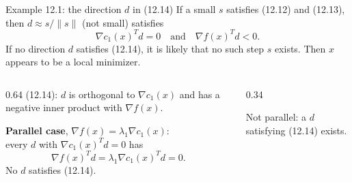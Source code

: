 \documentclass[aspectratio=169,12pt]{beamer}
\newcommand{\gradf}{\nabla f}
\begin{document}
\begin{frame}{Example 12.1: the direction $d$ in (12.14)}
  If a small $s$ satisfies (12.12) and (12.13), then $d\approx s/\|s\|$ (not small) satisfies
  \[ \nabla c_{1}(x)^{T}d=0\quad\text{and}\quad\gradf(x)^{T}d<0 . \tag{12.14} \]
  If no direction $d$ satisfies (12.14), it is likely that no such step $s$ exists.
  Then $x$ appears to be a local minimizer.
  \begin{columns}[T,totalwidth=\textwidth]
    \begin{column}{0.64\textwidth}
      \vspace{0.3em}
      (12.14): $d$ is orthogonal to $\nabla c_{1}(x)$ and has a negative inner product with $\gradf(x)$.

      \vspace{0.6em}
      \textbf{Parallel case}, $\gradf(x)=\lambda_{1}\nabla c_{1}(x)$:\\ every $d$ with
      $\nabla c_{1}(x)^{T}d=0$ has
      \[ \gradf(x)^{T}d=\lambda_{1}\nabla c_{1}(x)^{T}d=0 . \]
      No $d$ satisfies (12.14).
    \end{column}
    \begin{column}{0.34\textwidth}
      \centering

      {\small Not parallel: a $d$ satisfying (12.14) exists.}
    \end{column}
  \end{columns}
\end{frame}
\end{document}
